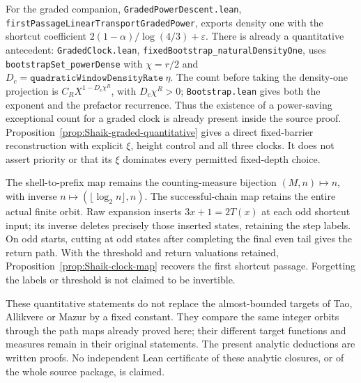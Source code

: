 For the graded companion, \texttt{GradedPowerDescent.lean},
\texttt{firstPassageLinearTransportGradedPower}, exports density one
with the shortcut coefficient \(2(1-\alpha)/\log(4/3)+\varepsilon\).
There is already a quantitative antecedent:
\texttt{GradedClock.lean}, \texttt{fixedBootstrap\_naturalDensityOne},
uses \texttt{bootstrapSet\_powerDense} with \(\chi=r/2\) and
\(D_c=\texttt{quadraticWindowDensityRate}\ \eta\).
The count before taking the density-one projection is
\(C_R X^{1-D_c\chi^R}\), with \(D_c\chi^R>0\);
\texttt{Bootstrap.lean} gives both the exponent and the prefactor
recurrence. Thus the existence of a power-saving exceptional count
for a graded clock is already present inside the source proof.
Proposition~\ref{prop:Shaik-graded-quantitative} gives a direct
fixed-barrier reconstruction with explicit \(\xi\), height control and
all three clocks. It does not assert priority or that its \(\xi\)
dominates every permitted fixed-depth choice.

The shell-to-prefix map remains the counting-measure bijection
\((M,n)\mapsto n\), with inverse \(n\mapsto(\lfloor\log_2n\rfloor,n)\).
The successful-chain map retains the entire actual finite orbit.
Raw expansion inserts \(3x+1=2T(x)\) at each odd shortcut input;
its inverse deletes precisely those inserted states, retaining the
step labels. On odd starts, cutting at odd states after completing
the final even tail gives the return path. With the threshold and
return valuations retained, Proposition~\ref{prop:Shaik-clock-map}
recovers the first shortcut passage. Forgetting the labels or threshold
is not claimed to be invertible.

These quantitative statements do not replace the almost-bounded
targets of Tao, Allikvere or Mazur by a fixed constant.
They compare the same integer orbits through the path maps already
proved here; their different target functions and measures remain
in their original statements. The present analytic deductions are
written proofs. No independent Lean certificate of these analytic
closures, or of the whole source package, is claimed.

